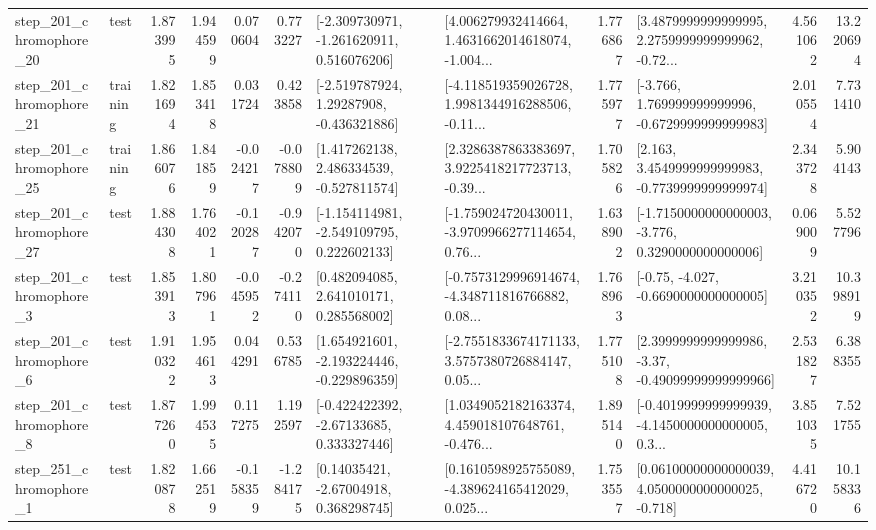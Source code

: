 \begin{tabular}{llrrrrllrlrr}
  step\_201\_chromophore\_20 &      test &      1.873995 &    1.944599 &      0.070604 &  0.773227 &   [-2.309730971, -1.261620911, 0.516076206] &  [4.006279932414664, 1.4631662014618074, -1.004... &       1.776867 &  [3.4879999999999995, 2.2759999999999962, -0.72... &            4.561062 &         13.220694 \\
  step\_201\_chromophore\_21 &  training &      1.821694 &    1.853418 &      0.031724 &  0.423858 &    [-2.519787924, 1.29287908, -0.436321886] &  [-4.118519359026728, 1.9981344916288506, -0.11... &       1.775977 &   [-3.766, 1.769999999999996, -0.6729999999999983] &            2.010554 &          7.731410 \\
  step\_201\_chromophore\_25 &  training &      1.866076 &    1.841859 &     -0.024217 & -0.078809 &    [1.417262138, 2.486334539, -0.527811574] &  [2.3286387863383697, 3.9225418217723713, -0.39... &       1.705826 &   [2.163, 3.4549999999999983, -0.7739999999999974] &            2.343728 &          5.904143 \\
  step\_201\_chromophore\_27 &      test &      1.884308 &    1.764021 &     -0.120287 & -0.942070 &   [-1.154114981, -2.549109795, 0.222602133] &  [-1.759024720430011, -3.9709966277114654, 0.76... &       1.638902 &  [-1.7150000000000003, -3.776, 0.3290000000000006] &            0.069009 &          5.527796 \\
   step\_201\_chromophore\_3 &      test &      1.853913 &    1.807961 &     -0.045952 & -0.274110 &     [0.482094085, 2.641010171, 0.285568002] &  [-0.7573129996914674, -4.348711816766882, 0.08... &       1.768963 &               [-0.75, -4.027, -0.6690000000000005] &            3.210352 &         10.398919 \\
   step\_201\_chromophore\_6 &      test &      1.910322 &    1.954613 &      0.044291 &  0.536785 &   [1.654921601, -2.193224446, -0.229896359] &  [-2.7551833674171133, 3.5757380726884147, 0.05... &       1.775108 &  [2.3999999999999986, -3.37, -0.49099999999999966] &            2.531827 &          6.388355 \\
   step\_201\_chromophore\_8 &      test &      1.877260 &    1.994535 &      0.117275 &  1.192597 &    [-0.422422392, -2.67133685, 0.333327446] &  [1.0349052182163374, 4.459018107648761, -0.476... &       1.895140 &  [-0.4019999999999939, -4.1450000000000005, 0.3... &            3.851035 &          7.521755 \\
   step\_251\_chromophore\_1 &      test &      1.820878 &    1.662519 &     -0.158359 & -1.284175 &      [0.14035421, -2.67004918, 0.368298745] &  [0.1610598925755089, -4.389624165412029, 0.025... &       1.753557 &  [0.06100000000000039, 4.0500000000000025, -0.718] &            4.416720 &         10.158336 \\

\end{tabular}
